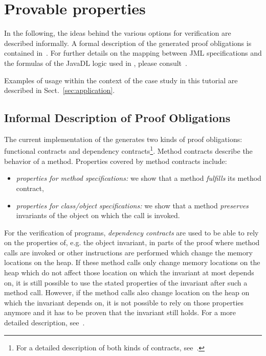 \section{Provable properties}
\label{sec:provableProp}
In the following, the ideas behind the various options for verification
are described informally. A formal description of the generated proof
obligations is contained in~\cite{KeYBook2016}. For
further details on the mapping between JML specifications and the
formulas of the JavaDL logic used in \KeY, please
consult~\cite{Engel05}. 

Examples of usage within the context of the case study in this
tutorial are described in Sect.~\ref{sec:application}.

\subsection{Informal Description of Proof Obligations}
The current implementation of the \kp{} generates two kinds of proof 
obligations: functional contracts and dependency 
contracts\footnote{For a detailed description of both kinds of contracts, see~\cite{Weiss2011}.}.
Method contracts describe the behavior of a method.
Properties covered by method contracts include:
\begin{itemize}
 \item \emph{properties for method specifications:} we show that a method
  \emph{fulfills} its method contract,
\item \emph{properties for class/object specifications:} we show that a method
  \emph{preserves} invariants of the object on which the call is invoked.

\end{itemize}

For the verification of programs, \emph{dependency contracts} are used to be able to rely on the 
properties of, e.g. the object invariant, in parts of the proof where 
method calls are invoked or other instructions are performed which change the memory locations on the heap. 
If these method calls only change memory locations on the heap which 
do not affect those location on which the invariant at most depends on, 
it is still possible to use the stated properties of the invariant after such a method call.
However, if the method calls also change location on the heap on which the invariant depends on, 
it is not possible to rely on those properties anymore and it has to be proven that the invariant 
still holds. For a more detailed description, see~\cite{Weiss2011}.


